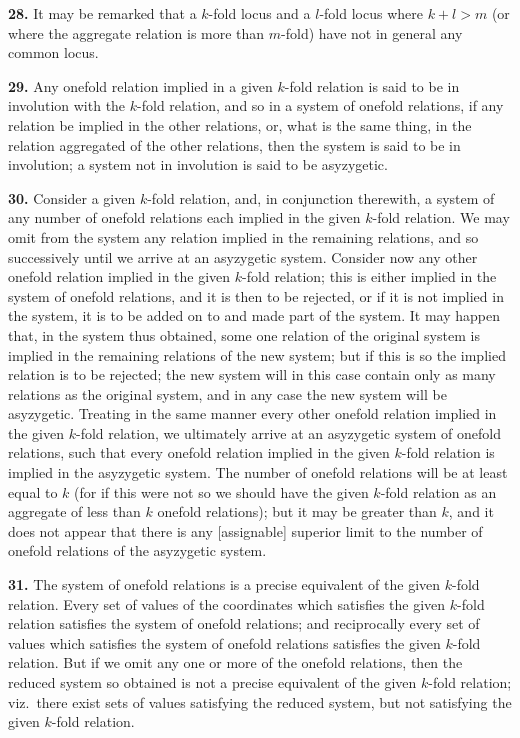 \documentclass[11pt,a4paper]{article}
\theoremstyle{definition}
\begin{document}
\noindent\textbf{28.} It may be remarked that a $k$-fold locus and a $l$-fold locus where $k+l>m$ (or where the aggregate relation is more than $m$-fold) have not in general any common locus.

\noindent\textbf{29.} Any onefold relation implied in a given $k$-fold relation is said to be in involution with the $k$-fold relation, and so in a system of onefold relations, if any relation be implied in the other relations, or, what is the same thing, in the relation aggregated of the other relations, then the system is said to be in involution; a system not in involution is said to be asyzygetic.

\noindent\textbf{30.} Consider a given $k$-fold relation, and, in conjunction therewith, a system of any number of onefold relations each implied in the given $k$-fold relation. We may omit from the system any relation implied in the remaining relations, and so successively until we arrive at an asyzygetic system. Consider now any other onefold relation implied in the given $k$-fold relation; this is either implied in the system of onefold relations, and it is then to be rejected, or if it is not implied in the system, it is to be added on to and made part of the system. It may happen that, in the system thus obtained, some one relation of the original system is implied in the remaining relations of the new system; but if this is so the implied relation is to be rejected; the new system will in this case contain only as many relations as the original system, and in any case the new system will be asyzygetic. Treating in the same manner every other onefold relation implied in the given $k$-fold relation, we ultimately arrive at an asyzygetic system of onefold relations, such that every onefold relation implied in the given $k$-fold relation is implied in the asyzygetic system. The number of onefold relations will be at least equal to $k$ (for if this were not so we should have the given $k$-fold relation as an aggregate of less than $k$ onefold relations); but it may be greater than $k$, and it does not appear that there is any [assignable] superior limit to the number of onefold relations of the asyzygetic system.

\setcounter{page}{459}

\noindent\textbf{31.} The system of onefold relations is a precise equivalent of the given $k$-fold relation. Every set of values of the coordinates which satisfies the given $k$-fold relation satisfies the system of onefold relations; and reciprocally every set of values which satisfies the system of onefold relations satisfies the given $k$-fold relation. But if we omit any one or more of the onefold relations, then the reduced system so obtained is not a precise equivalent of the given $k$-fold relation; viz.\ there exist sets of values satisfying the reduced system, but not satisfying the given $k$-fold relation.
\end{document}
